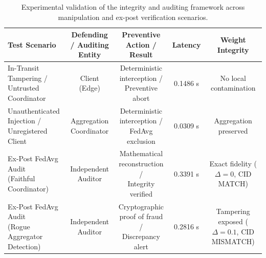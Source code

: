 \begin{table}
\caption{Experimental validation of the integrity and auditing framework across manipulation and ex-post verification scenarios.}\label{tab:resumen_ataques}
\footnotesize
\setlength{\tabcolsep}{6pt}
\renewcommand{\arraystretch}{1.25}
\begin{tabular*}{\textheight}{@{\extracolsep\fill}lcccc}
\toprule
\textbf{Test Scenario} & \makecell{\textbf{Defending / Auditing}\\\textbf{Entity}} & \makecell{\textbf{Preventive Action /}\\\textbf{Result}} & \textbf{Latency} & \makecell{\textbf{Weight}\\\textbf{Integrity}} \\
\midrule
\makecell[l]{In-Transit Tampering /\\Untrusted Coordinator} & \makecell{Client\\(Edge)} & \makecell{Deterministic interception /\\Preventive abort} & 0.1486 s & \makecell{No local\\contamination} \\ \midrule
\makecell[l]{Unauthenticated Injection /\\Unregistered Client} & \makecell{Aggregation\\Coordinator} & \makecell{Deterministic interception /\\FedAvg exclusion} & 0.0309 s & \makecell{Aggregation\\preserved} \\ \midrule
\makecell[l]{Ex-Post FedAvg Audit\\(Faithful Coordinator)} & \makecell{Independent\\Auditor} & \makecell{Mathematical reconstruction /\\Integrity verified} & 0.3391 s & \makecell{Exact fidelity\\($\Delta = 0$, CID MATCH)} \\ \midrule
\makecell[l]{Ex-Post FedAvg Audit\\(Rogue Aggregator Detection)} & \makecell{Independent\\Auditor} & \makecell{Cryptographic proof of fraud /\\Discrepancy alert} & 0.2816 s & \makecell{Tampering exposed\\($\Delta = 0.1$, CID MISMATCH)} \\
\bottomrule
\end{tabular*}
\end{table}

